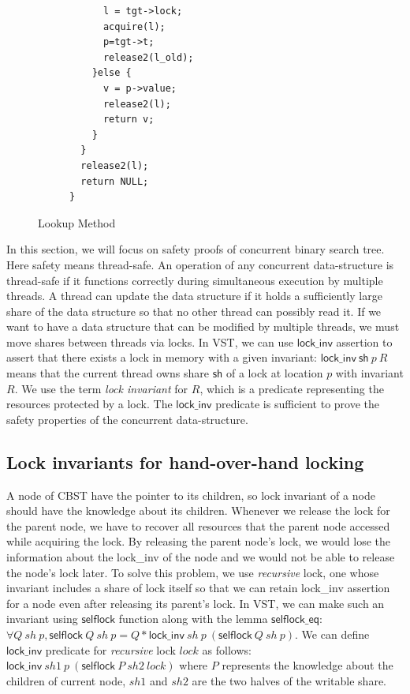 \documentclass[acmsmall,screen]{acmart}\settopmatter{printfolios=true}
\begin{document}
{\begin{figure}[htp]
\begin{subfigure}[t]{\textwidth}
\begin{lstlisting}
      l = tgt->lock;
      acquire(l);
      p=tgt->t;
      release2(l_old);
    }else {
      v = p->value;
      release2(l);
      return v;
    }
  }
  release2(l);
  return NULL;
}
\end{lstlisting}
\end{subfigure}
\caption{Lookup Method}
\label{lookup}
\end{figure}
In this section, we will focus on safety proofs of concurrent binary search tree. Here safety means thread-safe. An operation of any concurrent data-structure is thread-safe if it functions correctly during simultaneous execution by multiple threads. A thread can update the data structure if it holds a sufficiently large share of the data structure so that no other thread can possibly read it. If we want to have a data structure that can be modified by multiple threads, we must move shares between threads via locks. In VST, we can use $\mathsf{lock\_inv}$ assertion to assert that there exists a lock in memory with a given invariant: $\mathsf{lock\_inv}\ \mathsf{sh}\ p\ R$ means that the current thread owns share $\mathsf{sh}$ of a lock at location $p$ with invariant $R$. We use the term \emph{lock invariant} for $R$, which is a predicate representing the resources protected by a lock. The $\mathsf{lock\_inv}$ predicate is sufficient to prove the safety properties of the concurrent data-structure. 

   
\subsection{Lock invariants for hand-over-hand locking}
A node of CBST have the pointer to its children, so lock invariant of a node should have the knowledge about its children.   
Whenever we release the lock for the parent node, we have to recover all resources that the parent node accessed while acquiring the lock. By releasing the parent node's lock, we would lose the information about the lock\_inv of the node and we would not be able to release the node's lock later. To solve this problem, we use \emph{recursive} lock, one whose invariant includes a share of lock itself so that we can retain lock\_inv assertion for a node even after releasing its parent's lock. In VST, we can make such an invariant using $\mathsf{selflock}$ function along with the lemma $\mathsf{selflock\_eq}$: $\forall Q\ \mathit{sh}\ p, \mathsf{selflock}\ Q\ \mathit{sh}\ p = Q * \mathsf{lock\_inv}\ \mathit{sh}\ p\ (\mathsf{selflock}\ Q\ \mathit{sh}\ p)$. We can define $\mathsf{lock\_inv}$ predicate for \emph{recursive} lock $\mathit{lock}$ as follows: $\mathsf{lock\_inv}\ \mathit{sh1}\ p\ (\mathsf{selflock}\ P\ \mathit{sh2}\ \mathit{lock})$ where $\mathit{P}$ represents the knowledge about the children of current node, $\mathit{sh1}$ and $\mathit{sh2}$ are the two halves of the writable share.

}
\end{document}
